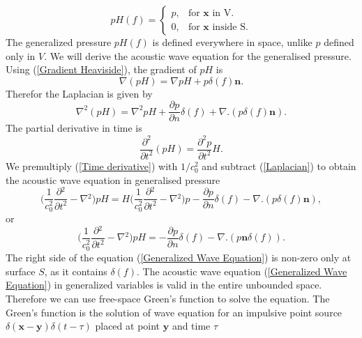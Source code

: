 \documentclass[a4paper]{article}
\begin{document}
\begin{equation}\label{Generalized_Functions}
	p H(f) =\begin{cases}
		p , & \text{for $\mathbf{x}$ in V}.     \\
		0,  & \text{for $\mathbf{x}$ inside S}.
	\end{cases}
\end{equation}
The generalized pressure $pH(f)$ is defined everywhere in space, unlike $p$ defined only in $V$. We will derive the acoustic wave equation for the generalised pressure. Using (\ref{Gradient Heaviside}), the gradient of $pH$ is
\begin{equation}
	\nabla (pH) = \nabla p H + p \delta(f)\mathbf{n}.
\end{equation}
Therefor the Laplacian is given by
\begin{equation}\label{Laplacian}
	\nabla^2 (pH) = \nabla^2 p H +  \frac{\partial p}{\partial n}\delta(f) + \nabla.(p \delta(f)\mathbf{n}).
\end{equation}
The partial derivative in time is
\begin{equation}\label{Time derivative}
	\frac{\partial^2}{\partial t^2}(pH) = \frac{\partial^2 p }{\partial t^2}H.
\end{equation}
We premultiply (\ref{Time derivative}) with $1/{c_{0}^2}$ and subtract (\ref{Laplacian}) to obtain the acoustic wave equation in generalised pressure
\begin{equation}
	\Bigg( \frac{1}{c_{0}^2}\frac{\partial{}^{2}}{\partial{t}^{2}}- \nabla{}^{2} \Bigg) pH = H\Bigg( \frac{1}{c_{0}^2}\frac{\partial{}^{2}}{\partial{t}^{2}}- \nabla{}^{2} \Bigg) p - \frac{\partial p}{\partial n}\delta(f) - \nabla.(p \delta(f)\mathbf{n}),
\end{equation}
or
\begin{equation}\label{Generalized Wave Equation}
	\Bigg( \frac{1}{c_{0}^2}\frac{\partial{}^{2}}{\partial{t}^{2}}- \nabla{}^{2} \Bigg) pH = -\frac{\partial p}{\partial n}\delta(f) - \nabla.(p \mathbf{n} \delta(f)).
\end{equation}
The right side of the equation (\ref{Generalized Wave Equation}) is non-zero only at surface $S$, as it contains $\delta (f)$. The acoustic wave equation (\ref{Generalized Wave Equation}) in generalized variables is valid in the entire unbounded space. Therefore we can use free-space Green's function to solve the equation. The Green's function is the solution of wave equation for an impulsive point source $\delta(\mathbf{x} - \mathbf{y})\delta(t - \tau)$ placed at point $\mathbf{y}$ and time $\tau$
\end{document}
